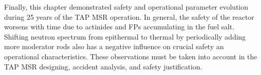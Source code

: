 Finally, this chapter demonstrated safety and operational parameter evolution 
during 25 years of the \gls{TAP} \gls{MSR} operation. In general, the safety 
of the reactor worsens with time due to actinides and \glspl{FP} accumulating 
in the fuel salt. Shifting neutron spectrum from epithermal to thermal by 
periodically adding more moderator rods also has a negative influence on 
crucial safety an operational characteristics. These observations must be 
taken into account in the \gls{TAP} \gls{MSR} designing, accident analysis, 
and safety justification.